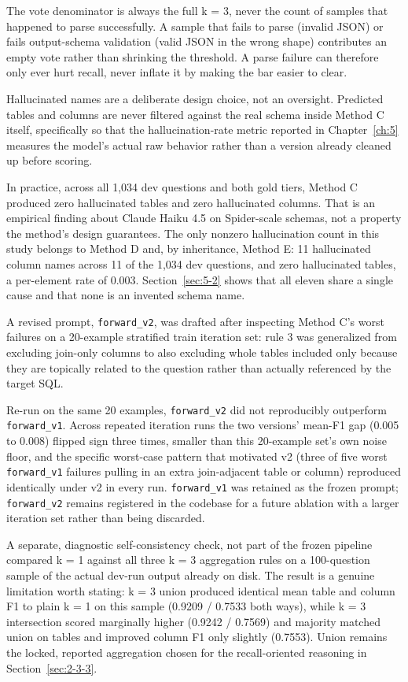 The vote denominator is always the full k = 3, never the count of samples that happened to parse successfully. A sample that fails to parse (invalid JSON) or fails output-schema validation (valid JSON in the wrong shape) contributes an empty vote rather than shrinking the threshold. A parse failure can therefore only ever hurt recall, never inflate it by making the bar easier to clear.

Hallucinated names are a deliberate design choice, not an oversight. Predicted tables and columns are never filtered against the real schema inside Method C itself, specifically so that the hallucination-rate metric reported in Chapter~\ref{ch:5} measures the model's actual raw behavior rather than a version already cleaned up before scoring.

In practice, across all 1,034 dev questions and both gold tiers, Method C produced zero hallucinated tables and zero hallucinated columns. That is an empirical finding about Claude Haiku 4.5 on Spider-scale schemas, not a property the method's design guarantees. The only nonzero hallucination count in this study belongs to Method D and, by inheritance, Method E: 11 hallucinated column names across 11 of the 1,034 dev questions, and zero hallucinated tables, a per-element rate of 0.003. Section~\ref{sec:5-2} shows that all eleven share a single cause and that none is an invented schema name.

A revised prompt, \texttt{forward\_v2}, was drafted after inspecting Method C's worst failures on a 20-example stratified train iteration set: rule 3 was generalized from excluding join-only columns to also excluding whole tables included only because they are topically related to the question rather than actually referenced by the target SQL.

Re-run on the same 20 examples, \texttt{forward\_v2} did not reproducibly outperform \texttt{forward\_v1}. Across repeated iteration runs the two versions' mean-F1 gap (0.005 to 0.008) flipped sign three times, smaller than this 20-example set's own noise floor, and the specific worst-case pattern that motivated v2 (three of five worst \texttt{forward\_v1} failures pulling in an extra join-adjacent table or column) reproduced identically under v2 in every run. \texttt{forward\_v1} was retained as the frozen prompt; \texttt{forward\_v2} remains registered in the codebase for a future ablation with a larger iteration set rather than being discarded.

A separate, diagnostic self-consistency check, not part of the frozen pipeline compared k = 1 against all three k = 3 aggregation rules on a 100-question sample of the actual dev-run output already on disk. The result is a genuine limitation worth stating: k = 3 union produced identical mean table and column F1 to plain k = 1 on this sample (0.9209 / 0.7533 both ways), while k = 3 intersection scored marginally higher (0.9242 / 0.7569) and majority matched union on tables and improved column F1 only slightly (0.7553). Union remains the locked, reported aggregation chosen for the recall-oriented reasoning in Section~\ref{sec:2-3-3}.

